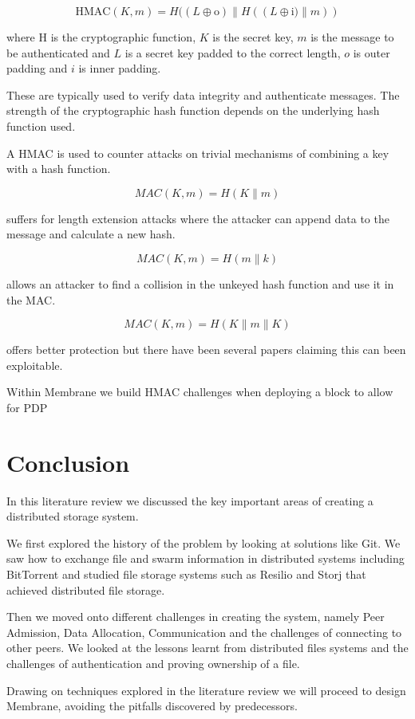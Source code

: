 \documentclass[11pt, a4paper, twocolumn, twoside]{report}
\begin{document}
$$\mbox{HMAC}(K, m) = H((L \oplus \mbox{o}) \parallel H((L \oplus \mbox{i)} \parallel m))$$

where H is the cryptographic function, $K$ is the secret key, $m$ is the message to be authenticated and $L$ is a secret key padded to the correct length, $o$ is outer padding and $i$ is inner padding.

These are typically used to verify data integrity and authenticate messages. The strength of the cryptographic hash function depends on the underlying hash function used.

A HMAC is used to counter attacks on trivial mechanisms of combining a key with a hash function.

$$MAC(K, m) = H(K \parallel m)$$

suffers for length extension attacks where the attacker can append data to the message and calculate a new hash. 

$$MAC(K, m) = H(m \parallel k)$$

allows an attacker to find a collision in the unkeyed hash function and use it in the MAC. 

$$MAC(K, m) = H(K \parallel m \parallel K)$$ 

offers better protection but there have been several papers claiming this can been exploitable. \citep{bellare1996keying}

Within Membrane we build HMAC challenges when deploying a block to allow for PDP

\section{Conclusion}
In this literature review we discussed the key important areas of creating a distributed storage system.

We first explored the history of the problem by looking at solutions like Git. We saw how to exchange file and swarm information in distributed systems including BitTorrent and studied file storage systems such as Resilio and Storj that achieved distributed file storage.

Then we moved onto different challenges in creating the system, namely Peer Admission, Data Allocation, Communication and the challenges of connecting to other peers. We looked at the lessons learnt from distributed files systems and the challenges of authentication and proving ownership of a file.

Drawing on techniques explored in the literature review we will proceed to design Membrane, avoiding the pitfalls discovered by predecessors.
\end{document}
